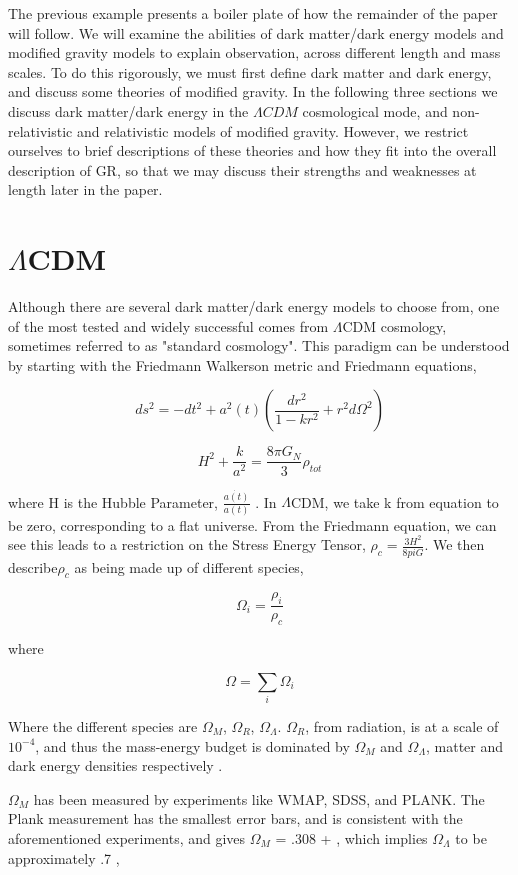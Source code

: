 \documentclass[12pt]{article}
\begin{document}
The previous example presents a boiler plate of how the remainder of the paper will follow. We will examine the abilities of dark matter/dark energy models and modified gravity models to explain observation, across different length and mass scales. To do this rigorously, we must first define dark matter and dark energy, and discuss some theories of modified gravity. In the following three sections we discuss dark matter/dark energy in the $\Lambda CDM$ cosmological mode, and non-relativistic and relativistic models of modified gravity. However, we restrict ourselves to brief descriptions of these theories and how they fit into the overall description of GR, so that we may discuss their strengths and weaknesses at length later in the paper.

\section{$\Lambda$CDM}

Although there are several dark matter/dark energy models to choose from, one of the most tested and widely successful comes from $\Lambda$CDM cosmology, sometimes referred to as "standard cosmology". This paradigm can be understood by starting with the Friedmann Walkerson metric and Friedmann equations,

$$ds^{2} = -dt^{2} + a^{2}(t) (\frac{dr^{2}}{1 - kr^{2}} + r^{2}d\Omega^{2})$$

$$ H^{2} + \frac{k}{a^2} = \frac{8\pi G_{N}}{3} \rho_{tot}$$

where H is the Hubble Parameter, $\frac{\dot{a(t)}}{a(t)}$ \cite{Bertone2004}. In $\Lambda$CDM, we take k from equation to be zero, corresponding to a flat universe. From the Friedmann equation, we can see this leads to a restriction on the Stress Energy Tensor, $\rho_{c} = \frac{3H^2}{8piG}$. We then describe$ \rho_{c}$ as being made up of different species,


$$\Omega_{i} = \frac{\rho_{i}}{\rho_{c}}$$

where 

$$\Omega = \sum_{i} \Omega_{i}$$

Where the different species are $\Omega_{M}$, $\Omega_{R}$, $\Omega_{\Lambda}$. $\Omega_{R}$, from radiation, is at a scale of ~$10^{-4}$, and thus the mass-energy budget is dominated by $\Omega_{M}$ and $\Omega_{\Lambda}$, matter and dark energy densities respectively \cite{Caroll2004}.

$\Omega_{M}$ has been measured by experiments like WMAP, SDSS, and PLANK. The Plank measurement has the smallest error bars, and is consistent with the aforementioned experiments, and gives $\Omega_{M}$ = .308 + , which implies $\Omega_{\Lambda}$ to be approximately .7 \cite{Plank2015}, \cite{SDSS2003}%
\end{document}
